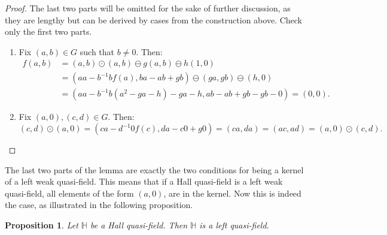 \documentclass{report}
\renewcommand{\H}{\mathbb{H}}
\newtheorem{proposition}[theorem]{Proposition}
\theoremstyle{definition}\newtheorem*{definition}{Definition}
\theoremstyle{definition}\newtheorem*{example}{Example}
\theoremstyle{remark}\newtheorem*{remark}{Remark}
\begin{document}
\begin{proof}
The last two parts will be omitted for the sake of further discussion, as they are lengthy but can be derived by cases from the construction above. Check only the first two parts.
\begin{enumerate}
  \item Fix $ (a, b) \in G $ such that $ b \ne 0 $. Then:
    \begin{align*}
    f (a, b)
    & = (a, b) \odot (a, b) \ominus g (a, b) \ominus h (1, 0) \\
    & = (aa - b^{-1} b f(a), ba - ab + gb) \ominus (ga, gb) \ominus (h, 0) \\
    & = (aa - b^{-1} b (a^2 - ga - h) - ga - h, ab - ab + gb - gb - 0)
    = (0, 0).
    \end{align*}
  \item Fix $ (a, 0), (c, d) \in G $. Then: $$ (c, d) \odot (a, 0) = (ca - d^{-1} 0 f(c), da - c0 + g0) = (ca, da) = (ac, ad) = (a, 0) \odot (c, d). $$
\end{enumerate}
\end{proof}

The last two parts of the lemma are exactly the two conditions for being a kernel of a left weak quasi-field. This means that if a Hall quasi-field is a left weak quasi-field, all elements of the form $ (a, 0) $, are in the kernel. Now this is indeed the case, as illustrated in the following proposition.

\begin{proposition}
Let $ \H $ be a Hall quasi-field. Then $ \H $ is a left quasi-field.
\end{proposition}
\end{document}
